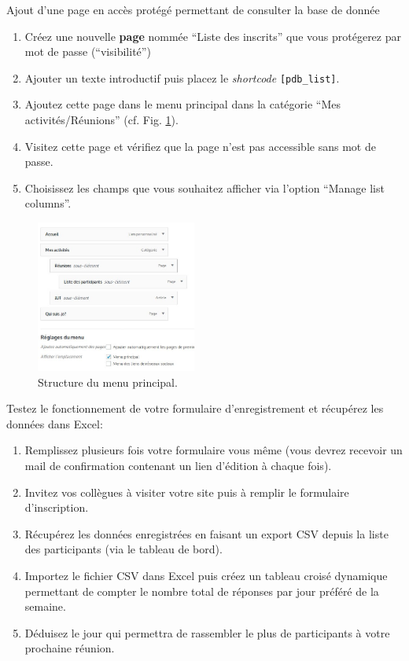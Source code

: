 \documentclass[a4paper, 8pt]{article}
\begin{document}
\exost Ajout d'une page en acc\`es prot\'eg\'e permettant de consulter la base de donn\'ee
\begin{enumerate}
 \item Cr\'eez une nouvelle \textbf{page} nomm\'ee ``Liste des inscrits'' que vous prot\'egerez par mot de passe (``visibilit\'e'')
 \item Ajouter un texte introductif puis placez le \textit{shortcode} \verb?[pdb_list]?.
 \item Ajoutez cette page dans le menu principal dans la cat\'egorie ``Mes activit\'es/R\'eunions'' (cf. Fig. \ref{fig:menu}).
 \item Visitez cette page et v\'erifiez que la page n'est pas accessible sans mot de passe.
 \item Choisissez les champs que vous souhaitez afficher via l'option ``Manage list columns''.
\end{enumerate}
\clearpage
\begin{figure}[!ht]
\begin{center}
\includegraphics[height=5cm]{menu_wp.jpg} %
\end{center}
\caption{Structure du menu principal.}
\label{fig:menu}
\end{figure}



\exost Testez le fonctionnement de votre formulaire d'enregistrement et r\'ecup\'erez les donn\'ees dans Excel:
\begin{enumerate}
 \item Remplissez plusieurs fois votre formulaire vous m\^eme (vous devrez recevoir un mail de confirmation contenant un lien d'\'edition \`a chaque fois).
 \item Invitez vos coll\`egues \`a visiter votre site puis \`a remplir le formulaire d'inscription.
 \item R\'ecup\'erez les donn\'ees enregistr\'ees en faisant un export CSV depuis la liste des participants (via le tableau de bord).
 \item Importez le fichier CSV dans Excel puis cr\'eez un tableau crois\'e dynamique permettant de compter le nombre total de r\'eponses par jour pr\'ef\'er\'e de la semaine.
 \item D\'eduisez le jour qui permettra de rassembler le plus de participants \`a votre prochaine r\'eunion.
\end{enumerate}

\end{document}
